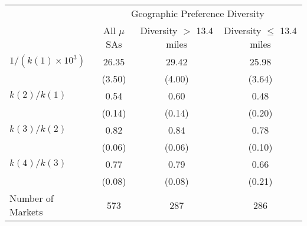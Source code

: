 \begin{tabular}{l c c c}  
& \multicolumn{3}{c}{ Geographic Preference Diversity } \\ 
&  All $\mu$SAs  & Diversity $>$ 13.4 miles & Diversity $\leq$ 13.4 miles  \\ 
$1/\left(k(1)\times 10^3\right)$ & 26.35 & 29.42 & 25.98 \\ 
& (3.50) & (4.00) & (3.64) \\ 
$k(2)/k(1)$ & 0.54 & 0.60 & 0.48 \\ 
& (0.14) & (0.14) & (0.20) \\ 
$k(3)/k(2)$ & 0.82 & 0.84 & 0.78 \\ 
& (0.06) & (0.06) & (0.10) \\ 
$k(4)/k(3)$ & 0.77 & 0.79 & 0.66 \\ 
& (0.08) & (0.08) & (0.21) \\ 
Number of Markets & 573 & 287 & 286 \\ 
\end{tabular} 
